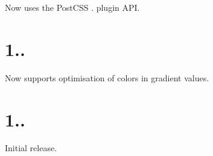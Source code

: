 \begin{DoxyItemize}
\item Now uses the Post\+C\+SS {.} plugin A\+PI.
\end{DoxyItemize}

\section*{1..}


\begin{DoxyItemize}
\item Now supports optimisation of colors in gradient values.
\end{DoxyItemize}

\section*{1..}


\begin{DoxyItemize}
\item Initial release. 
\end{DoxyItemize}